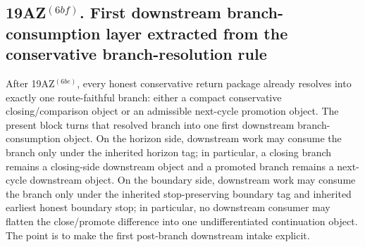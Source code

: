 \subsection*{19AZ$^{(6bf)}$. First downstream branch-consumption layer extracted from the conservative branch-resolution rule}
\label{sec:first-downstream-branch-consumption-layer-extracted-from-the-conservative-branch-resolution-rule}
After 19AZ$^{(6be)}$, every honest conservative return package already resolves into exactly one route-faithful branch: either a compact conservative closing/comparison object or an admissible next-cycle promotion object. The present block turns that resolved branch into one first downstream branch-consumption object. On the horizon side, downstream work may consume the branch only under the inherited horizon tag; in particular, a closing branch remains a closing-side downstream object and a promoted branch remains a next-cycle downstream object. On the boundary side, downstream work may consume the branch only under the inherited stop-preserving boundary tag and inherited earliest honest boundary stop; in particular, no downstream consumer may flatten the close/promote difference into one undifferentiated continuation object. The point is to make the first post-branch downstream intake explicit.

